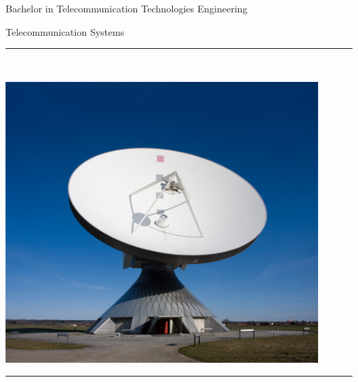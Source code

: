 \documentclass[../main.tex]{subfiles}
\begin{document}
\begin{titlepage}
	\begin{sffamily}
		\color{azulUC3M}

		\begin{center}

			\begin{figure}[H]
			\end{figure}
			\vspace{1.5cm}

			{\Large Bachelor in Telecommunication Technologies Engineering}\\

			\vspace*{0.2cm}

			{\Huge Telecommunication Systems}\\

			\vspace*{0.5cm}
			\rule{10.5cm}{0.1mm}\\
			\vspace*{0.6cm}

			\includegraphics[width=12cm]{images/UC3M/Erdfunkstelle_Raisting_2.jpg}

			\rule{10.5cm}{0.1mm}\\
			\vspace*{0.5cm}


\end{center}
\end{sffamily}
\end{titlepage}
\end{document}
